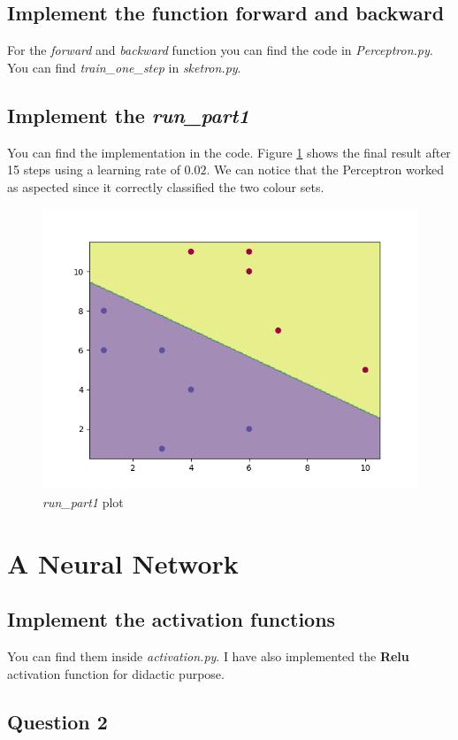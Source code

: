 \documentclass[11pt]{article}
\begin{document}
\subsection{Implement the function forward and backward}
For the \emph{forward} and \emph{backward} function you can find the code in \emph{Perceptron.py}. You can find \emph{train\_one\_step} in \emph{sketron.py}.

\subsection{Implement the \emph{run\_part1}}
You can find the implementation in the code. Figure \ref{fig:runPart1} shows the final result after 15 steps using a learning rate of $0.02$. We can notice that the Perceptron worked as aspected since it correctly classified the two colour sets.
\begin{figure}[H]
	\centering
	\includegraphics[scale=0.5]{images/run_part1}
	\caption{\emph{run\_part1} plot}
	\label{fig:runPart1}
\end{figure}

\section{A Neural Network}
\subsection{ Implement the activation functions}
You can find them inside \emph{activation.py}. I have also implemented the \textbf{Relu} activation function for didactic purpose.
\subsection{Question 2}
\end{document}
